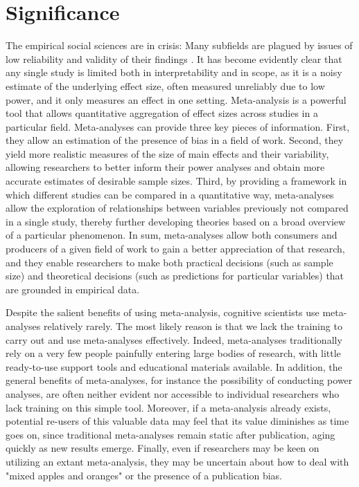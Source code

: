 \documentclass[10pt,letterpaper]{article}
\begin{document}
\section{Significance}

The empirical social sciences are in crisis: Many subfields are plagued by issues of low reliability and validity of their findings \cite{ioannidis2005most,open2013reproducibility,open2015estimating}. It has become evidently clear that any single study is limited both in interpretability and in scope, as it is a noisy estimate of the underlying effect size, often measured unreliably due to low power, and it only measures an effect in one setting. Meta-analysis is a powerful tool that allows quantitative aggregation of effect sizes across studies in a particular field. Meta-analyses can provide three key pieces of information. First, they allow an estimation of the presence of bias in a field of work. Second, they  yield more realistic measures of the size of main effects and their variability, allowing researchers to better inform their power analyses and obtain more accurate estimates of desirable  sample sizes. Third, by providing a framework in which different studies can be compared in a quantitative way, meta-analyses allow the exploration of relationships between variables previously not compared in a single study, thereby further developing theories based on a broad overview of a particular phenomenon. In sum, meta-analyses allow both consumers and producers of a given field of work to gain a better appreciation of that research, and they enable  researchers to make both practical decisions (such as sample size) and theoretical decisions (such as predictions for particular variables) that are grounded in empirical data.%


Despite the salient benefits of using meta-analysis, cognitive scientists use meta-analyses relatively rarely. The most likely reason is that we lack the training to carry out and use meta-analyses effectively. Indeed,  meta-analyses traditionally rely on a very few people painfully entering large bodies of research,  with little ready-to-use support tools and educational materials available. In addition, the general benefits of meta-analyses, for instance the possibility of conducting power analyses, are often neither evident nor accessible to individual researchers who lack training on this simple tool. Moreover, if a meta-analysis already exists, potential re-users of this valuable data may feel that its value diminishes as time goes on, since traditional meta-analyses remain static after publication, aging quickly as new results emerge. Finally, even if researchers may be keen on utilizing an extant meta-analysis, they may be uncertain about how to deal with "mixed apples and oranges" or the presence of a publication bias. 
\end{document}
